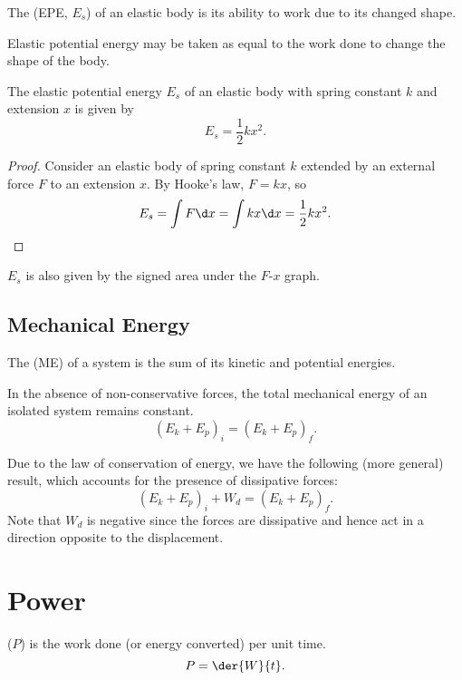 \begin{definition}
    The  (EPE, $E_s$) of an elastic body is its ability to work due to its changed shape.
\end{definition}

Elastic potential energy may be taken as equal to the work done to change the shape of the body.

\begin{proposition}
    The elastic potential energy $E_s$ of an elastic body with spring constant $k$ and extension $x$ is given by \[E_s = \frac12 kx^2.\]
\end{proposition}
\begin{proof}
    Consider an elastic body of spring constant $k$ extended by an external force $F$ to an extension $x$. By Hooke's law, $F = kx$, so \[E_s = \int F \d x = \int kx \d x = \frac12 kx^2.\]
\end{proof}

$E_s$ is also given by the signed area under the $F$-$x$ graph.

\subsection{Mechanical Energy}

\begin{definition}
    The  (ME) of a system is the sum of its kinetic and potential energies.
\end{definition}

\begin{law}
    In the absence of non-conservative forces, the total mechanical energy of an isolated system remains constant. \[(E_k + E_p)_i = (E_k + E_p)_f.\]
\end{law}

Due to the law of conservation of energy, we have the following (more general) result, which accounts for the presence of dissipative forces: \[(E_k + E_p)_i + W_d = (E_k + E_p)_f.\] Note that $W_d$ is negative since the forces are dissipative and hence act in a direction opposite to the displacement.

\section{Power}

\begin{definition}
     ($P$) is the work done (or energy converted) per unit time. \[P = \der{W}{t}.\]
\end{definition}


